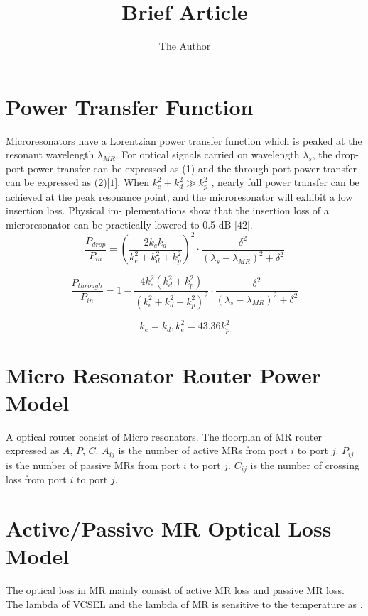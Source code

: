 \documentclass[12pt]{article}
\title{Brief Article}
\author{The Author}
\date{}                                           %
\begin{document}
\maketitle

\section{Power Transfer Function}
	Microresonators have a Lorentzian power transfer function which is peaked at the resonant wavelength $\lambda _{MR}$. For optical signals carried on wavelength $\lambda_{s}$, the drop-port power transfer can be expressed as (1) and the through-port power transfer can be expressed as (2)[$1$]. When   $k_{e}^{2} + k_{d}^{2} \gg k_{p}^2$ , nearly full power transfer can be achieved at the peak resonance point, and the microresonator will exhibit a low insertion loss. Physical im- plementations show that the insertion loss of a microresonator can be practically lowered to 0.5 dB [$42$].
\begin{equation}
\label{drop-port power transfer} 
\frac{P_{drop}}{P_{in}}=\left ( \frac{2k_{e}k_{d}}{k_{e}^2 + k_{d}^2 + k_{p}^2} \right )^2 \cdot \frac{\delta ^2}{\left ( \lambda _{s} -  \lambda _{MR}\right )^2 + \delta ^2}
\end{equation}

\begin{equation}
\label{through-port power transfer} 
\frac{P_{through}}{P_{in}}=1-  \frac{4k_{e}^2(k_{d}^2+k_{p}^2)}{\left ( k_{e}^2 + k_{d}^2 + k_{p}^2 \right )^2} \cdot \frac{\delta ^2}{\left ( \lambda _{s} -  \lambda _{MR}\right )^2 + \delta ^2}
\end{equation}

\begin{equation}
\label{Parameter Detail} 
k_{e} = k_{d}, k_{e}^2 = 43.36 k_{p}^2
\end{equation}

\section{Micro Resonator Router Power Model}
A optical router consist of Micro resonators. The floorplan of MR router expressed as $A$, $P$, $C$. $A_{ij}$ is the number of active MRs from port $i$ to port $j$. $P_{ij}$ is the number of passive MRs from port $i$ to port $j$.  $C_{ij}$ is the number of crossing loss from port $i$  to port $j$. 

\section{Active/Passive MR Optical Loss Model}
The optical loss in MR mainly consist of active MR loss and passive MR loss. The lambda of VCSEL and the lambda of MR is sensitive to the temperature as .
\end{document}
